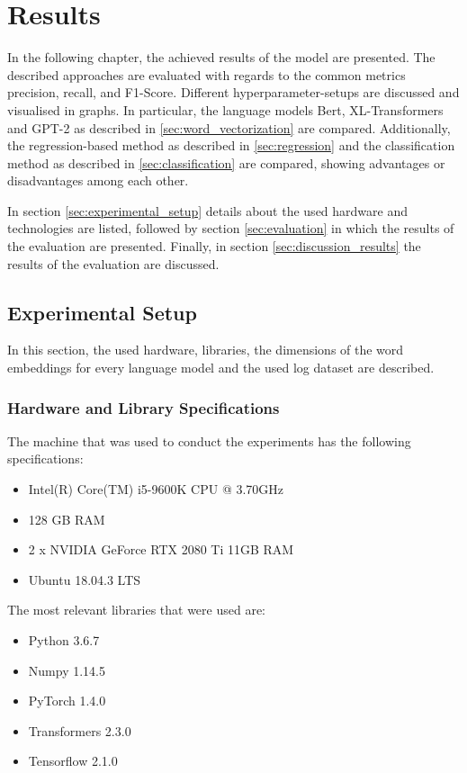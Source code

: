 \chapter{Results\label{cha:results}}

In the following chapter, the achieved results of the model are presented. The described approaches are evaluated with regards to the common metrics precision, recall, and F1-Score. Different hyperparameter-setups are discussed and visualised in graphs. In particular, the language models Bert, XL-Transformers and GPT-2 as described in \ref{sec:word_vectorization} are compared. Additionally, the regression-based method as described in \ref{sec:regression} and the classification method as described in \ref{sec:classification} are compared, showing advantages or disadvantages among each other.

In section \ref{sec:experimental_setup} details about the used hardware and technologies are listed, followed by section \ref{sec:evaluation} in which the results of the evaluation are presented. Finally, in section \ref{sec:discussion_results} the results of the evaluation are discussed.


\section{Experimental Setup\label{sec:experimental_setup}}
In this section, the used hardware, libraries, the dimensions of the word embeddings for every language model and the used log dataset are described.

\subsection{Hardware and Library Specifications}
The machine that was used to conduct the experiments has the following specifications:
\begin{itemize}
	\item Intel(R) Core(TM) i5-9600K CPU @ 3.70GHz
	\item 128 GB RAM
	\item 2 x NVIDIA GeForce RTX 2080 Ti 11GB RAM
	\item Ubuntu 18.04.3 LTS
\end{itemize}

\noindent The most relevant libraries that were used are:
\begin{itemize}
	\item Python 3.6.7
	\item Numpy 1.14.5
	\item PyTorch 1.4.0
	\item Transformers 2.3.0
	\item Tensorflow 2.1.0
\end{itemize}

